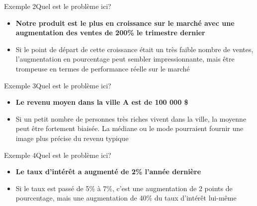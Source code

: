 \documentclass[xcolor=dvipsnames, mathserif, 10pt, aspectratio=169, handout]{beamer}
\begin{document}


\begin{frame}{Exemple 2}{Quel est le problème ici?}


\begin{important}
	\begin{itemize}
		\item[] \textbf{Notre produit est le plus en croissance sur le marché avec une augmentation des ventes de 200\% le trimestre dernier}
		\pause
		\item[\winner] Si le point de départ de cette croissance était un très faible nombre de ventes, l'augmentation en pourcentage peut sembler impressionnante, mais être trompeuse en termes de performance réelle sur le marché
	\end{itemize}
\end{important}
	
\end{frame}


\begin{frame}{Exemple 3}{Quel est le problème ici?}


\begin{important}
	\begin{itemize}
		\item[] \textbf{Le revenu moyen dans la ville A est de 100 000 \$}
		\pause
		\item[\winner] Si un petit nombre de personnes très riches vivent dans la ville, la moyenne peut être fortement biaisée. La médiane ou le mode pourraient fournir une image plus précise du revenu typique
	\end{itemize}
\end{important}
	
\end{frame}


\begin{frame}{Exemple 4}{Quel est le problème ici?}


\begin{important}
	\begin{itemize}
		\item[] \textbf{Le taux d'intérêt a augmenté de 2\% l'année dernière}
		\pause
		\item[\winner] Si le taux est passé de 5\% à 7\%, c'est une augmentation de 2 points de pourcentage, mais une augmentation de 40\% du taux d'intérêt lui-même
	\end{itemize}
\end{important}
	
\end{frame}
\end{document}
